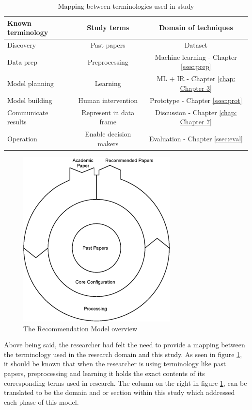 \begin{table}[htbp]
\centering
\begin{tabular}{|l|c|c|}
\hline
\textbf{Known terminology} & \textbf{Study terms} & \textbf{Domain of techniques} \\ \hline
Discovery & Past papers & Dataset\\ \hline
Data prep & Preprocessing & Machine learning - Chapter \ref{ssec:prep}\\ \hline
Model planning & Learning & ML + IR - Chapter \ref{chap: Chapter 3} \\ \hline
Model building & Human intervention & Prototype - Chapter \ref{ssec:prot} \\ \hline
Communicate results & Represent in data frame & Discussion - Chapter \ref{chap: Chapter 7}\\ \hline
Operation & Enable decision makers & Evaluation - Chapter \ref{ssec:eval} \\ \hline
\end{tabular}
\caption{Mapping between terminologies used in study}
\label{tab:mapping}
\end{table}

\begin{figure}[htbp]
\centering
\includegraphics[width=8cm]{./figures/overview3.eps}
\caption{The Recommendation Model overview}
\label{fig:Modeloverview}
\end{figure}

Above being said, the researcher had felt the need to provide a mapping between the terminology used in the research domain and this study. As seen in figure \ref{tab:mapping}, it should be known that when the researcher is using terminology like past papers, preprocessing and learning it holds the exact contents of its corresponding terms used in research. The column on the right in figure \ref{tab:mapping}, can be translated to be the domain and or section within this study which addressed each phase of this model.


